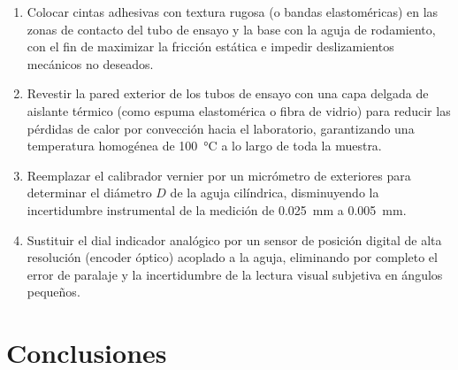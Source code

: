 \begin{enumerate}
    \item Colocar cintas adhesivas con textura rugosa (o bandas elastoméricas) en las zonas de contacto del tubo de ensayo y la base con la aguja de rodamiento, con el fin de maximizar la fricción estática e impedir deslizamientos mecánicos no deseados.
    \item Revestir la pared exterior de los tubos de ensayo con una capa delgada de aislante térmico (como espuma elastomérica o fibra de vidrio) para reducir las pérdidas de calor por convección hacia el laboratorio, garantizando una temperatura homogénea de \qty{100}{\celsius} a lo largo de toda la muestra.
    \item Reemplazar el calibrador vernier por un micrómetro de exteriores para determinar el diámetro $D$ de la aguja cilíndrica, disminuyendo la incertidumbre instrumental de la medición de \qty{0,025}{\milli\meter} a \qty{0,005}{\milli\meter}.
    \item Sustituir el dial indicador analógico por un sensor de posición digital de alta resolución (encoder óptico) acoplado a la aguja, eliminando por completo el error de paralaje y la incertidumbre de la lectura visual subjetiva en ángulos pequeños.
\end{enumerate}

\section{Conclusiones}
\label{sec:conclusiones}

